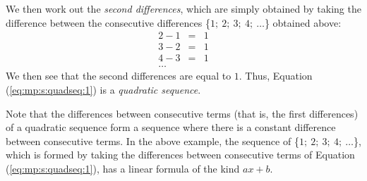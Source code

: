 We then work out the \textit{second differences}, which are simply obtained by taking the difference between the consecutive differences \{$1; \: 2; \: 3; \: 4; \: \ldots $\} obtained above:
\begin{eqnarray*}
2 - 1 &=& 1 \\
3 - 2 &=& 1 \\
4 - 3 &=& 1 \\
\ldots
\end{eqnarray*}
We then see that the second differences are equal to $1$. Thus, Equation (\ref{eq:mp:s:quadseq:1}) is a \textit{quadratic sequence}. 

Note that the differences between consecutive terms (that is, the first differences) of a quadratic sequence form a sequence where there is a constant difference between consecutive terms. In the above example, the sequence of \{$1; \: 2; \: 3; \: 4; \: \ldots $\}, which is formed by taking the differences between consecutive terms of Equation (\ref{eq:mp:s:quadseq:1}), has a linear formula of the kind $ax+b$. 




